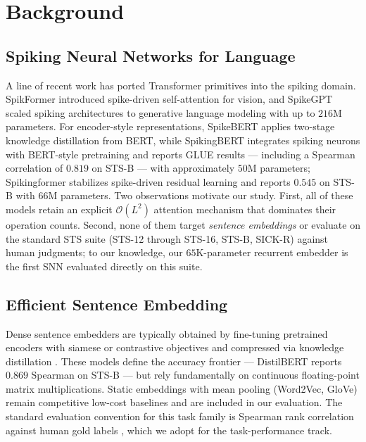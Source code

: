 \documentclass[runningheads]{llncs}
\begin{document}
\section{Background}

\subsection{Spiking Neural Networks for Language}
A line of recent work has ported Transformer primitives into the spiking domain. SpikFormer \cite{zhou2023spikformer} introduced spike-driven self-attention for vision, and SpikeGPT \cite{zhu2023spikegpt} scaled spiking architectures to generative language modeling with up to $216$M parameters. For encoder-style representations, SpikeBERT \cite{lv2023spikebert} applies two-stage knowledge distillation from BERT, while SpikingBERT \cite{bal2024spikingbert} integrates spiking neurons with BERT-style pretraining and reports GLUE results --- including a Spearman correlation of $0.819$ on STS-B --- with approximately $50$M parameters; Spikingformer \cite{zhou2025spikingformer} stabilizes spike-driven residual learning and reports $0.545$ on STS-B with $66$M parameters. Two observations motivate our study. First, all of these models retain an explicit $\mathcal{O}(L^2)$ attention mechanism that dominates their operation counts. Second, none of them target \textit{sentence embeddings} or evaluate on the standard STS suite (STS-12 through STS-16, STS-B, SICK-R) against human judgments; to our knowledge, our $65$K-parameter recurrent embedder is the first SNN evaluated directly on this suite.

\subsection{Efficient Sentence Embedding}
Dense sentence embedders are typically obtained by fine-tuning pretrained encoders with siamese \cite{reimers2019sentence} or contrastive \cite{gao2021simcse} objectives and compressed via knowledge distillation \cite{hinton2015distilling,sanh2019distilbert,wang2020minilm}. These models define the accuracy frontier --- DistilBERT reports $0.869$ Spearman on STS-B \cite{sanh2019distilbert} --- but rely fundamentally on continuous floating-point matrix multiplications. Static embeddings with mean pooling (Word2Vec, GloVe) remain competitive low-cost baselines and are included in our evaluation. The standard evaluation convention for this task family is Spearman rank correlation against human gold labels \cite{muennighoff2022mteb,cer2017semeval}, which we adopt for the task-performance track.
\end{document}
